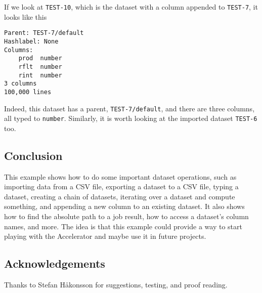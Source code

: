 \documentclass[a4paper]{article}
\begin{document}
If we look at \texttt{TEST-10}, which is the dataset with a column
appended to \texttt{TEST-7}, it looks like this
\begin{snugshade}
\begin{Verbatim}[commandchars=\\\{\}]
Parent: TEST-7/default
Hashlabel: None
Columns:
    prod  number
    rflt  number
    rint  number
3 columns
100,000 lines
\end{Verbatim}
\end{snugshade}
Indeed, this dataset has a parent, \texttt{TEST-7/default}, and there
are three columns, all typed to \texttt{number}.
Similarly, it is worth looking at the imported dataset \texttt{TEST-6} too.



\subsection*{Conclusion}
This example shows how to do some important dataset operations, such
as importing data from a CSV file, exporting a dataset to a CSV file,
typing a dataset, creating a chain of datasets, iterating over a
dataset and compute something, and appending a new column to an
existing dataset.  It also shows how to find the absolute path to a
job result, how to access a dataset's column names, and more.  The
idea is that this example could provide a way to start playing with
the Accelerator and maybe use it in future projects.



\vfill
\subsection*{Acknowledgements}
Thanks to Stefan H{\aa}konsson for suggestions, testing, and proof reading.
\end{document}
